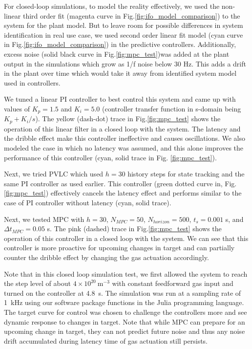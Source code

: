For closed-loop simulations, to model the reality effectively, we used the non-linear third order fit (magenta curve in Fig.\ref{fig:ifo_model_comparison}) to the system for the plant model. But to leave room for possible differences in system identification in real use case, we used second order linear fit model (cyan curve in Fig.\ref{fig:ifo_model_comparison}) in the predictive controllers. Additionally, excess noise (solid black curve in Fig.\ref{fig:mpc_test})was added at the plant output in the simulations which grow as 1/f noise below 30 Hz. This adds a drift in the plant over time which would take it away from identified system model used in controllers.

We tuned a linear PI controller to best control this system and came up with values of $K_p=1.5$ and $K_i=5.0$ (controller transfer function in s-domain being $K_p + K_i/s$). The yellow (dash-dot) trace in Fig.\ref{fig:mpc_test} shows the operation of this linear filter in a closed loop with the system. The latency and the dribble effect make this controller ineffective and causes oscillations. We also modeled the case in which no latency was assumed, and this alone improves the performance of this controller (cyan, solid trace in Fig. \ref{fig:mpc_test}).

Next, we tried \ac{PVLC} which used $h=30$ history steps for state tracking and the same PI controller as used earlier. This controller (green dotted curve in, Fig. \ref{fig:mpc_test}) effectively cancels the latency effect and performs similar to the case of PI controller without latency (cyan, solid trace).

Next, we tested \ac{MPC} with $h=30$, $N_{MPC} = 50$, $N_{horizon}=500$, $t_s=0.001$ s, and $\Delta t_{MPC}=0.05$ s. The pink (dashed) trace in Fig.\ref{fig:mpc_test} shows the operation of this controller in a closed loop with the system. We can see that this controller is more proactive for upcoming changes in target and can partially counter the dribble effect by changing the gas actuation accordingly.

Note that in this closed loop simulation test, we first allowed the system to reach the step level of about $4\times10^{20}~\mathrm{m}^{-3}$ with constant feedforward gas input and turned on the controller at 4.8~s. The simulation was run at a sampling rate of 1~kHz using our software package functions in the Julia\cite{bezanson_2017} programming language. The target curve for control was chosen to challenge the controllers more and see dynamic response to changes in target. Note that while \ac{MPC} can prepare for an upcoming change in target, they can not predict future noise and thus any noise drift accumulated during latency time of gas actuation still persists.
